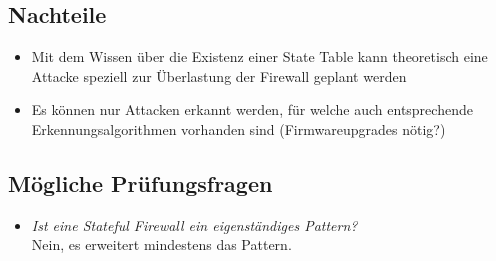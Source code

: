 \subsection*{Nachteile}
\begin{itemize}
	\item Mit dem Wissen über die Existenz einer State Table kann theoretisch eine Attacke speziell zur Überlastung der Firewall geplant werden
	\item Es können nur Attacken erkannt werden, für welche auch entsprechende Erkennungsalgorithmen vorhanden sind (Firmwareupgrades nötig?)
\end{itemize}

\subsection*{Mögliche Prüfungsfragen}
\begin{itemize}
	\item \emph{Ist eine Stateful Firewall ein eigenständiges Pattern?}\\
	Nein, es erweitert mindestens das  Pattern.
\end{itemize}
